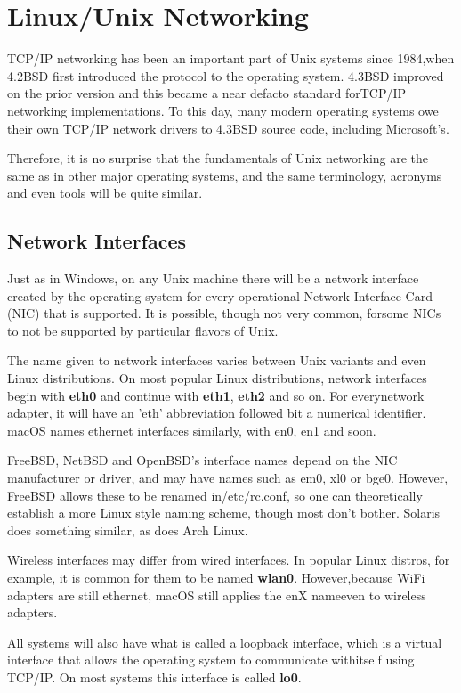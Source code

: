 \chapter{Linux/Unix Networking}

TCP/IP networking has been an important part of Unix systems since 1984,when 4.2BSD first introduced the protocol to the operating system. 4.3BSD improved on the prior version and this became a near defacto standard forTCP/IP networking implementations. To this day, many modern operating systems owe their own TCP/IP network drivers to 4.3BSD source code, including Microsoft’s.

Therefore, it is no surprise that the fundamentals of Unix networking are the same as in other major operating systems, and the same terminology, acronyms and even tools will be quite similar.

\section{Network Interfaces}

Just as in Windows, on any Unix machine there will be a network interface created by the operating system for every operational Network Interface Card (NIC) that is supported. It is possible, though not very common, forsome NICs to not be supported by particular flavors of Unix. 

The name given to network interfaces varies between Unix variants and even Linux distributions. On most popular Linux distributions, network interfaces begin with \textbf{eth0} and continue with \textbf{eth1}, \textbf{eth2} and so on. For everynetwork adapter, it will have an 'eth' abbreviation followed bit a numerical identifier. macOS names ethernet interfaces similarly, with en0, en1 and soon. 

FreeBSD, NetBSD and OpenBSD’s interface names depend on the NIC manufacturer or driver, and may have names such as em0, xl0 or bge0. However, FreeBSD allows these to be renamed in/etc/rc.conf, so one can theoretically establish a more Linux style naming scheme, though most don't bother. Solaris does something similar, as does Arch Linux. 

Wireless interfaces may differ from wired interfaces. In popular Linux distros, for example, it is common for them to be named \textbf{wlan0}. However,because WiFi adapters are still ethernet, macOS still applies the enX nameeven to wireless adapters.

All systems will also have what is called a loopback interface, which is a virtual interface that allows the operating system to communicate withitself using TCP/IP. On most systems this interface is called \textbf{lo0}.

